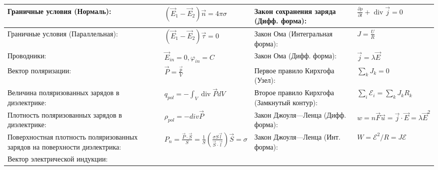 \documentclass{article}
\begin{document}
\begin{tabular}{ |p{6cm}|p{3.5cm}|p{6cm}|p{3.5cm}|  }
\hline
Граничные условия (Нормаль):                                               &
$\left(\vec{E}_{1}-\vec{E}_{2}\right) \vec n =4 \pi \sigma$                &
Закон сохранения заряда (Дифф. форма):                                     &
$\frac{\partial \rho}{\partial t}+\operatorname{div} \vec{j}=0$            \\
\hline
Граничные условия (Параллельная):                                          &
$\left(\vec {E}_{1}-\vec{E}_{2}\right) \vec\tau=0$                         &
Закон Ома (Интегральная форма):                                            &
$J=\frac{U}{R}$                                                            \\
\hline
Проводники:                                                                &
$\vec E_{in} = 0, {\varphi}_{in} = C$                                      &
Закон Ома (Дифф. форма):                                                   &
$\vec{j}=\lambda \vec{E}$                                                  \\
\hline
Вектор поляризации:                                                        &
$\vec{P}=\frac{\vec{p}}{V}$                                                &
Первое правило Кирхгофа (Узел):                                            &
$\sum_{k} J_{k}=0$                                                         \\
\hline
Величина поляризованных зарядов в диэлектрике:                             &
$q_{pol}=-\int_{V} \operatorname{div} \vec{P} d V$                         &
Второе правило Кирхгофа (Замкнутый контур):                                &
$\sum_{i} \mathcal{E}_{i}=\sum_{k} J_{k} R_{k}$                            \\
\hline
Плотность поляризованных зарядов в диэлектрике:                            &
${\rho}_{pol}=-{div} \vec{P}$                                              &
Закон Джоуля—Ленца (Дифф. форма):                                          &
$w=n \vec{F} \vec{u}=\vec{j} \cdot \vec{E} = \lambda \vec{E}^{2}$          \\
\hline
Поверхностная плотность поляризованных зарядов на поверхности диэлектрика: &
$P_{n}=\frac{\vec{P} \cdot \vec{S}}{S} = \frac{1}{S}\left(\frac{\sigma S \vec{l}}{\vec{S} \cdot \vec{l}}\right) \vec{S}=\sigma$ &
Закон Джоуля—Ленца (Инт. форма):                                           &
$W=\mathcal{E}^{2} / R=J \mathcal{E}$                                      \\
\hline
Вектор электрической индукции:                                             &

\end{tabular}
\end{document}
